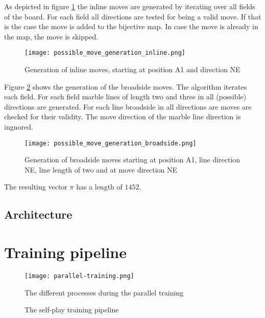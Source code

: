 \begin{enumerate}
          As depicted in figure \ref{possible_move_generation_inline} the inline moves are generated by iterating over all fields of the board. For each field all directions are tested for being a valid move. If that is the case the move is added to the bijective map. In case the move is already in the map, the move is skipped.

          \begin{figure}
              \centering
              \texttt{[image: possible\_move\_generation\_inline.png]}
              \caption{Generation of inline moves, starting at position A1 and direction NE}
              \label{possible_move_generation_inline}
          \end{figure}

          Figure \ref{possible_move_generation_broadside} shows the generation of the broadside moves. The algorithm iterates each field. For each field marble lines of length two and three in all (possible) directions are generated. For each line broadside in all directions are moves are checked for their validity. The move direction of the marble line direction is ingnored.

          \begin{figure}
              \centering
              \texttt{[image: possible\_move\_generation\_broadside.png]}
              \caption{Generation of broadside moves starting at position A1, line direction NE, line length of two and at move direction NE}
              \label{possible_move_generation_broadside}
          \end{figure}

          The resulting vector $\pi$ has a length of $1452$.
\end{enumerate}

\subsection{Architecture}

\section{Training pipeline}
\begin{figure}
    \centering
    \texttt{[image: parallel-training.png]}
    \caption{The different processes during the parallel training}
    \label{parallel_training_pipeline}
\end{figure}

\begin{figure}[!h]
    \centering
    \caption{The self-play training pipeline}
    \label{training_algorithm}
\end{figure}
